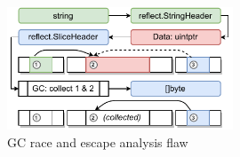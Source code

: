 \begin{figure}[htp!]
    \centering
    \includegraphics[width=0.6\textwidth]{assets/figures/chapter3/gcrace-vuln.pdf}
    \caption{GC race and escape analysis flaw}
    \label{fig:gcrace-vuln}
\end{figure}
